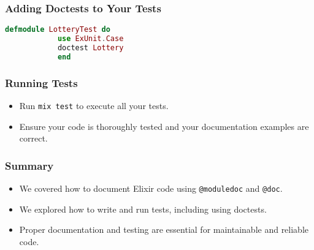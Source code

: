 \documentclass[aspectratio=169, table]{beamer}
\begin{document}
	\begin{frame}[fragile]
		\frametitle{Adding Doctests to Your Tests}
		\begin{lstlisting}[language=Elixir]
			defmodule LotteryTest do
			use ExUnit.Case
			doctest Lottery
			end
		\end{lstlisting}
	\end{frame}
	
	\begin{frame}
		\frametitle{Running Tests}
		\begin{itemize}
			\item Run \texttt{mix test} to execute all your tests.
			\item Ensure your code is thoroughly tested and your documentation examples are correct.
		\end{itemize}
	\end{frame}
	
	\begin{frame}
		\frametitle{Summary}
		\begin{itemize}
			\item We covered how to document Elixir code using \texttt{@moduledoc} and \texttt{@doc}.
			\item We explored how to write and run tests, including using doctests.
			\item Proper documentation and testing are essential for maintainable and reliable code.
		\end{itemize}
	\end{frame}
	
\end{document}
